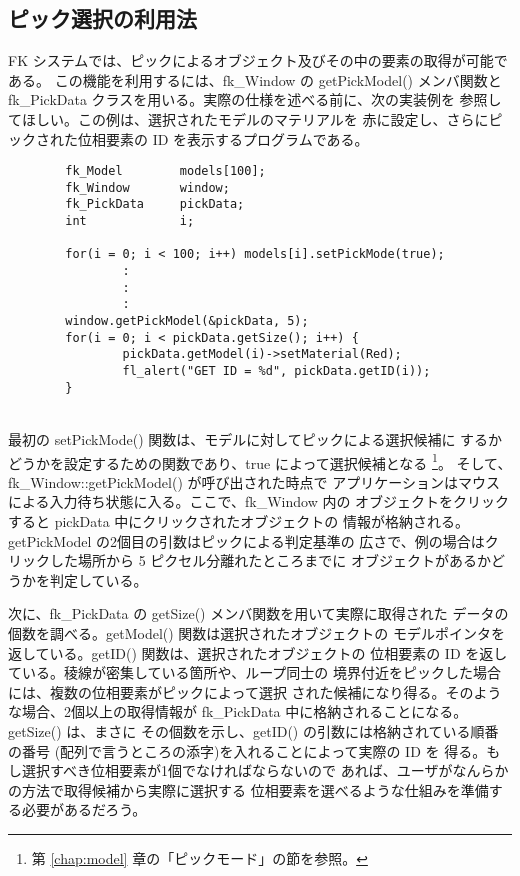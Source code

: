 \subsection{ピック選択の利用法} \label{subsec:pickexam}
FK システムでは、ピックによるオブジェクト及びその中の要素の取得が可能である。
この機能を利用するには、fk\_Window の getPickModel() メンバ関数と
fk\_PickData クラスを用いる。実際の仕様を述べる前に、次の実装例を
参照してほしい。この例は、選択されたモデルのマテリアルを
赤に設定し、さらにピックされた位相要素の ID を表示するプログラムである。
\\
\begin{breakbox}
\begin{verbatim}
        fk_Model        models[100];
        fk_Window       window;
        fk_PickData     pickData;
        int             i;

        for(i = 0; i < 100; i++) models[i].setPickMode(true);
                :
                :
                :
        window.getPickModel(&pickData, 5);
        for(i = 0; i < pickData.getSize(); i++) {
                pickData.getModel(i)->setMaterial(Red);
                fl_alert("GET ID = %d", pickData.getID(i));
        }
\end{verbatim}
\end{breakbox}
~ \\
最初の setPickMode() 関数は、モデルに対してピックによる選択候補に
するかどうかを設定するための関数であり、true によって選択候補となる
\footnote{第 \ref{chap:model} 章の「ピックモード」の節を参照。}。
そして、fk\_Window::getPickModel() が呼び出された時点で
アプリケーションはマウスによる入力待ち状態に入る。ここで、fk\_Window 内の
オブジェクトをクリックすると pickData 中にクリックされたオブジェクトの
情報が格納される。getPickModel の2個目の引数はピックによる判定基準の
広さで、例の場合はクリックした場所から 5 ピクセル分離れたところまでに
オブジェクトがあるかどうかを判定している。

次に、fk\_PickData の getSize() メンバ関数を用いて実際に取得された
データの個数を調べる。getModel() 関数は選択されたオブジェクトの
モデルポインタを返している。getID() 関数は、選択されたオブジェクトの
位相要素の ID を返している。稜線が密集している箇所や、ループ同士の
境界付近をピックした場合には、複数の位相要素がピックによって選択
された候補になり得る。そのような場合、2個以上の取得情報が
fk\_PickData 中に格納されることになる。getSize() は、まさに
その個数を示し、getID() の引数には格納されている順番の番号
(配列で言うところの添字)を入れることによって実際の ID を
得る。もし選択すべき位相要素が1個でなければならないので
あれば、ユーザがなんらかの方法で取得候補から実際に選択する
位相要素を選べるような仕組みを準備する必要があるだろう。

